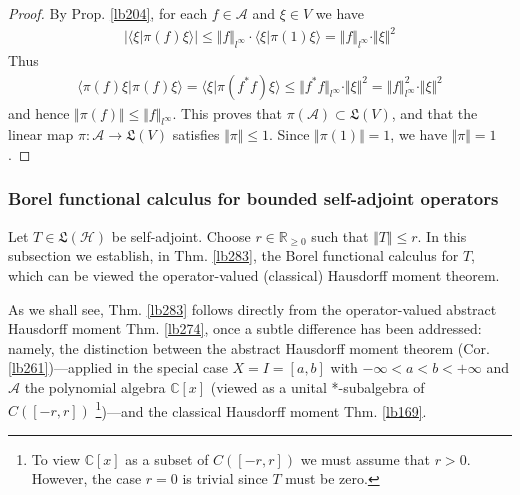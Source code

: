 \documentclass[12pt,b5paper,notitlepage]{article}
\theoremstyle{definition}
\theoremstyle{plain}
\newcommand{\fk}{\mathfrak}
\newcommand{\bk}[1]{\langle {#1}\rangle}
\newcommand{\scr}{\mathscr}
\newcommand{\Cbb}{\mathbb C}
\newcommand{\Rbb}{\mathbb R}
\newcommand{\MH}{\mathcal H}
\newcommand{\SA}{\mathscr A}
\numberwithin{equation}{section}
\begin{document}
\begin{proof}
By Prop. \ref{lb204}, for each $f\in\scr A$ and $\xi\in V$ we have
\begin{align*}
|\bk{\xi|\pi(f)\xi}|\leq \Vert f\Vert_{l^\infty}\cdot\bk{\xi|\pi(1)\xi}=\Vert f\Vert_{l^\infty}\cdot \Vert\xi\Vert^2
\end{align*}
Thus
\begin{align*}
\bk{\pi(f)\xi|\pi(f)\xi}=\bk{\xi|\pi(f^*f)\xi}\leq \Vert f^*f\Vert_{l^\infty}\cdot \Vert\xi\Vert^2=\Vert f\Vert_{l^\infty}^2\cdot\Vert\xi\Vert^2
\end{align*}
and hence $\Vert\pi(f)\Vert\leq\Vert f\Vert_{l^\infty}$. This proves that $\pi(\SA)\subset\fk L(V)$, and that the linear map $\pi:\SA\rightarrow\fk L(V)$ satisfies $\Vert\pi\Vert\leq1$. Since $\Vert\pi(1)\Vert=1$, we have $\Vert\pi\Vert=1$.
\end{proof}







\subsubsection{Borel functional calculus for bounded self-adjoint operators}



Let $T\in\fk L(\MH)$ be self-adjoint. Choose $r\in\Rbb_{\geq0}$ such that $\Vert T\Vert\leq r$. In this subsection we establish, in Thm. \ref{lb283}, the Borel functional calculus for $T$, which can be viewed the operator-valued (classical) Hausdorff moment theorem.

As we shall see, Thm. \ref{lb283} follows directly from the operator-valued abstract Hausdorff moment Thm. \ref{lb274}, once a subtle difference has been addressed: namely, the distinction between the abstract Hausdorff moment theorem (Cor. \ref{lb261})---applied in the special case $X=I=[a,b]$ with $-\infty<a<b<+\infty$ and $\scr A$ the polynomial algebra $\Cbb[x]$ (viewed as a unital *-subalgebra of $C([-r,r])$ \footnote{To view $\Cbb[x]$ as a subset of $C([-r,r])$ we must assume that $r>0$. However, the case $r=0$ is trivial since $T$ must be zero.})---and the classical Hausdorff moment Thm. \ref{lb169}.
\end{document}

